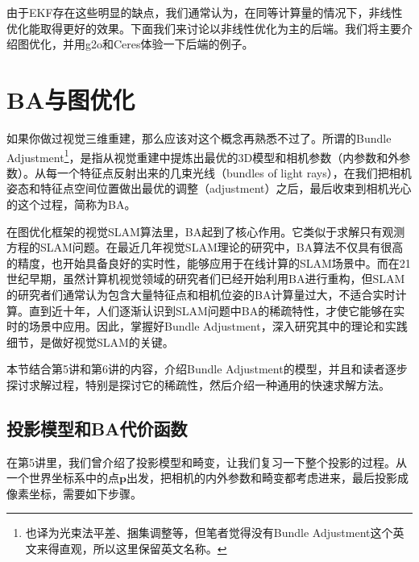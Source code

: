 由于EKF存在这些明显的缺点，我们通常认为，在同等计算量的情况下，非线性优化能取得更好的效果\textsuperscript{\cite{Strasdat2012}}。下面我们来讨论以非线性优化为主的后端。我们将主要介绍图优化，并用g2o和Ceres体验一下后端的例子。

\section{BA与图优化}
如果你做过视觉三维重建，那么应该对这个概念再熟悉不过了。所谓的Bundle Adjustment\footnote{也译为光束法平差、捆集调整等，但笔者觉得没有Bundle Adjustment这个英文来得直观，所以这里保留英文名称。}，是指从视觉重建中提炼出最优的3D模型和相机参数（内参数和外参数）。从每一个特征点反射出来的几束光线（bundles of light rays），在我们把相机姿态和特征点空间位置做出最优的调整（adjustment）之后，最后收束到相机光心的这个过程\textsuperscript{\cite{Triggs2000}}，简称为BA。

在图优化框架的视觉SLAM算法里，BA起到了核心作用。它类似于求解只有观测方程的SLAM问题。在最近几年视觉SLAM理论的研究中，BA算法不仅具有很高的精度，也开始具备良好的实时性，能够应用于在线计算的SLAM场景中。而在21世纪早期，虽然计算机视觉领域的研究者们已经开始利用BA进行重构，但SLAM的研究者们通常认为包含大量特征点和相机位姿的BA计算量过大，不适合实时计算。直到近十年，人们逐渐认识到SLAM问题中BA的稀疏特性，才使它能够在实时的场景中应用\textsuperscript{\cite{Cadena2016, Lourakis2009}}。因此，掌握好Bundle Adjustment，深入研究其中的理论和实践细节，是做好视觉SLAM的关键。

本节结合第5讲和第6讲的内容，介绍Bundle Adjustment的模型，并且和读者逐步探讨求解过程，特别是探讨它的稀疏性，然后介绍一种通用的快速求解方法。

\subsection{投影模型和BA代价函数}
在第5讲里，我们曾介绍了投影模型和畸变，让我们复习一下整个投影的过程。从一个世界坐标系中的点$\bm{p}$出发，把相机的内外参数和畸变都考虑进来，最后投影成像素坐标，需要如下步骤。


